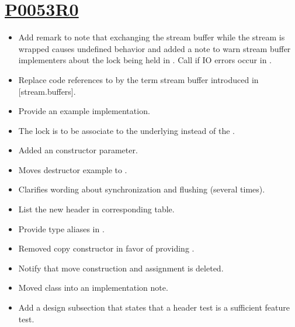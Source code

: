 \documentclass[ebook,11pt,article]{memoir}
\begin{document}
\section{\href{https://wg21.link/P0053R0}{P0053R0}}
\begin{itemize}
\item Add remark to note that exchanging the stream buffer while the stream is wrapped causes undefined behavior and added a note to warn stream buffer implementers about the lock being held in . Call  if IO errors occur in .
\item Replace code references to  by the term stream buffer introduced in [stream.buffers].
\item Provide an example implementation.
\item The lock is to be associate to the underlying  instead of the .
\item Added an  constructor parameter.
\item Moves destructor example to .
\item Clarifies wording about synchronization and flushing (several times).
\item List the new header in corresponding table.
\item Provide type aliases in .
\item Removed copy constructor in favor of providing .
\item Notify that move construction and assignment is deleted.
\item Moved class  into an implementation note.
\item Add a design subsection that states that a header test is a sufficient feature test.
\end{itemize}
\end{document}

